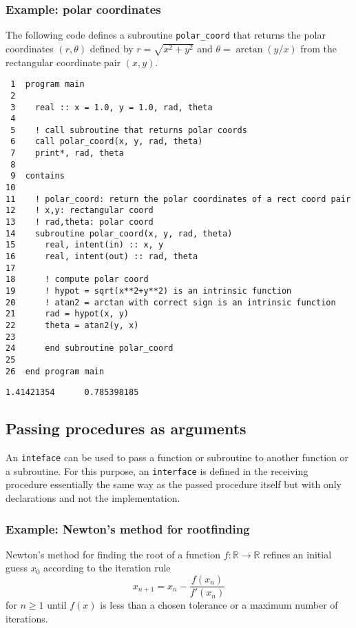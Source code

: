 \documentclass[11pt]{article}
\begin{document}
\subsubsection{Example: polar coordinates}
\label{sec:orgheadline43}
The following code defines a subroutine \texttt{polar\_coord} that returns the polar coordinates \((r,\theta)\) defined by \(r=\sqrt{x^2+y^2}\) and \(\theta=\arctan(y/x)\) from the rectangular coordinate pair \((x,y)\).
\begin{verbatim}
 1  program main
 2  
 3    real :: x = 1.0, y = 1.0, rad, theta
 4  
 5    ! call subroutine that returns polar coords
 6    call polar_coord(x, y, rad, theta)
 7    print*, rad, theta
 8  
 9  contains
10  
11    ! polar_coord: return the polar coordinates of a rect coord pair
12    ! x,y: rectangular coord
13    ! rad,theta: polar coord
14    subroutine polar_coord(x, y, rad, theta)
15      real, intent(in) :: x, y
16      real, intent(out) :: rad, theta
17  
18      ! compute polar coord
19      ! hypot = sqrt(x**2+y**2) is an intrinsic function
20      ! atan2 = arctan with correct sign is an intrinsic function
21      rad = hypot(x, y)
22      theta = atan2(y, x)
23  
24      end subroutine polar_coord
25  
26  end program main
\end{verbatim}

\begin{verbatim}
1.41421354      0.785398185
\end{verbatim}

\subsection{Passing procedures as arguments}
\label{sec:orgheadline47}
An \texttt{inteface} can be used to pass a function or subroutine to another function or a subroutine. For this purpose, an \texttt{interface} is defined in the receiving procedure essentially the same way as the passed procedure itself but with only declarations and not the implementation.
\subsubsection{Example: Newton's method for rootfinding}
\label{sec:orgheadline45}
Newton's method for finding the root of a function \(f:\mathbb{R}\rightarrow\mathbb{R}\) refines an initial guess \(x_0\) according to the iteration rule
\begin{equation*}
x_{n+1}=x_n-\frac{f(x_n)}{f'(x_n)}
\end{equation*}
for \(n\geq1\) until \(f(x)\) is less than a chosen tolerance or a maximum number of iterations.
\end{document}

